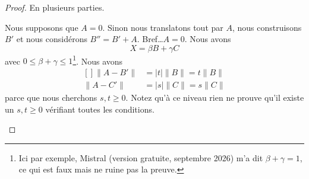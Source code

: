 \begin{proof}
	En plusieurs parties.
	\begin{subproof}
		\spitem[Translation]
		Nous supposons que \( A=0\). Sinon nous translatons tout par \( A\), nous construisons \( B'\) et nous considérons \( B''=B'+A\). Bref\ldots \( A=0\). Nous avons
		\begin{equation}		\label{EQooTHJAooJhNtev}
			X=\beta B+\gamma C
		\end{equation}
		avec \(0\leq \beta+\gamma\leq 1\)\footnote{Ici par exemple, Mistral (version gratuite, septembre 2026) m'a dit \( \beta+\gamma=1\), ce qui est faux mais ne ruine pas la preuve.}. Nous avons
		\begin{equation}		\label{EQooYCMXooOELEoO}
			\begin{aligned}[]
				\| A-B' \| & =| t |\| B \|=t\| B \| \\
				\| A-C' \| & =| s |\| C \|=s\| C \|
			\end{aligned}
		\end{equation}
		parce que nous cherchons \( s,t\geq 0\). Notez qu'à ce niveau rien ne prouve qu'il existe un \( s,t\geq 0\) vérifiant toutes les conditions.


\end{subproof}
\end{proof}
